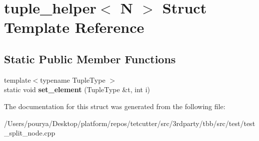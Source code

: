 \hypertarget{structtuple__helper}{}\section{tuple\+\_\+helper$<$ N $>$ Struct Template Reference}
\label{structtuple__helper}
\subsection*{Static Public Member Functions}
\begin{DoxyCompactItemize}
\item 
\hypertarget{structtuple__helper_acce1c600b6b4b16ba68d2c079f8c68c1}{}{\footnotesize template$<$typename Tuple\+Type $>$ }\\static void {\bfseries set\+\_\+element} (Tuple\+Type \&t, int i)\label{structtuple__helper_acce1c600b6b4b16ba68d2c079f8c68c1}

\end{DoxyCompactItemize}


The documentation for this struct was generated from the following file\+:\begin{DoxyCompactItemize}
\item 
/\+Users/pourya/\+Desktop/platform/repos/tetcutter/src/3rdparty/tbb/src/test/test\+\_\+split\+\_\+node.\+cpp\end{DoxyCompactItemize}
